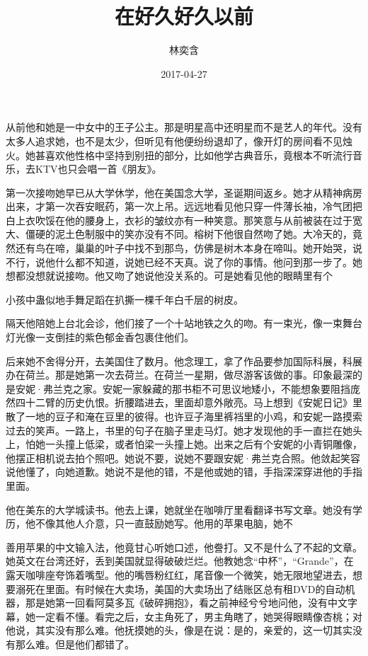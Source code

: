 \documentclass{article}
\title{在好久好久以前}
\author{林奕含}
\date{2017-04-27}
\begin{document}

\maketitle


\Large

﻿从前他和她是一中女中的王子公主。那是明星高中还明星而不是艺人的年代。没有太多人追求她，也不是太少，但听见有他便纷纷退却了，像开灯的房间看不见烛火。她甚喜欢他性格中坚持到别扭的部分，比如他学古典音乐，竟根本不听流行音乐，去KTV也只会唱一首《朋友》。

第一次接吻她早已从大学休学，他在美国念大学，圣诞期间返乡。她才从精神病房出来，才第一次吞安眠药，第一次上吊。远远地看见他只穿一件薄长袖，冷气团把白上衣吹馁在他的腰身上，衣衫的皱纹亦有一种笑意。那笑意与从前被装在过于宽大、僵硬的泥土色制服中的笑亦没有不同。榕树下他很自然吻了她。大冷天的，竟然还有鸟在啼，巢巢的叶子中找不到那鸟，仿佛是树木本身在啼叫。她开始哭，说不行，说他什么都不知道，说她已经不天真。说了你的事情。他问到那一步了。她想都没想就说接吻。他又吻了她说他没关系的。可是她看见他的眼睛里有个

\newpage 

小孩中蛊似地手舞足蹈在扒撕一棵千年白千层的树皮。

隔天他陪她上台北会诊，他们接了一个十站地铁之久的吻。有一束光，像一束舞台灯光像一支倒挂的紫色郁金香包裹住他们。

后来她不舍得分开，去美国住了数月。他念理工，拿了作品要参加国际科展，科展办在荷兰。那是她第一次去荷兰。在荷兰一星期，做尽游客该做的事。印象最深的是安妮·弗兰克之家。安妮一家躲藏的那书柜不可思议地矮小，不能想象要阻挡庞然四十二臂的历史仇恨。折腰踏进去，里面却意外敞亮。马上想到《安妮日记》里散了一地的豆子和淹在豆里的彼得。也许豆子海里裤裆里的小鸡，和安妮一路摸索过去的笑声。一路上，书里的句子在脑子里走马灯。她才发现他的手一直拦在她头上，怕她一头撞上低梁，或者怕梁一头撞上她。出来之后有个安妮的小青铜雕像，他摆正相机说去拍个照吧。她说不要，说她不要跟安妮·弗兰克合照。他敛起笑容说他懂了，向她道歉。她说不是他的错，不是他或她的错，手指深深穿进他的手指里面。

他在美东的大学城读书。他去上课，她就坐在咖啡厅里看翻译书写文章。她没有学历，他不像其他人介意，只一直鼓励她写。他用的苹果电脑，她不

\newpage 

善用苹果的中文输入法，他竟甘心听她口述，他誊打。又不是什么了不起的文章。她英文在台湾还好，丢到美国就显得破破烂烂。他教她念“中杯”，“Grande”，在露天咖啡座夸饰着嘴型。他的嘴唇粉红红，尾音像一个微笑，她无限地望进去，想要溺死在里面。有时候在大卖场，美国的大卖场出了结账区总有租DVD的自动机器，那是她第一回看阿莫多瓦《破碎拥抱》，看之前神经兮兮地问他，没有中文字幕，她一定看不懂。看完之后，女主角死了，男主角瞎了，她哭得眼睛像杏桃；对他说，其实没有那么难。他抚摸她的头，像是在说：是的，亲爱的，这一切其实没有那么难。但是他们都错了。
\end{document}
